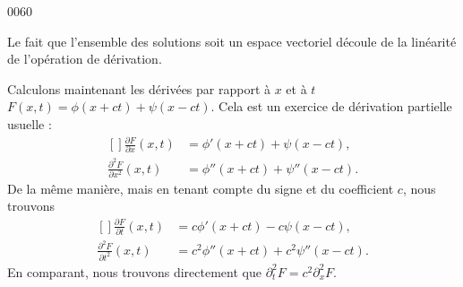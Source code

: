 
\begin{corrige}{0060}

Le fait que l'ensemble des solutions soit un espace vectoriel découle de la linéarité de l'opération de dérivation.

Calculons maintenant les dérivées par rapport à $x$ et à $t$ $F(x,t)=\phi(x+ct)+\psi(x-ct)$. Cela est un exercice de dérivation partielle usuelle :
\begin{equation}
	\begin{aligned}[]
		\frac{ \partial F }{ \partial x }(x,t)&=\phi'(x+ct)+\psi(x-ct),\\
		\frac{ \partial^2F  }{ \partial x^2 }(x,t)&=\phi''(x+ct)+\psi''(x-ct).
	\end{aligned}
\end{equation}
De la même manière, mais en tenant compte du signe et du coefficient $c$, nous trouvons
\begin{equation}
	\begin{aligned}[]
		\frac{ \partial F }{ \partial t }(x,t)&=c\phi'(x+ct)-c\psi(x-ct),\\
		\frac{ \partial^2F  }{ \partial t^2 }(x,t)&=c^2\phi''(x+ct)+c^2\psi''(x-ct).
	\end{aligned}
\end{equation}
En comparant, nous trouvons directement que $\partial^2_tF=c^2\partial^2_xF$.


\end{corrige}
